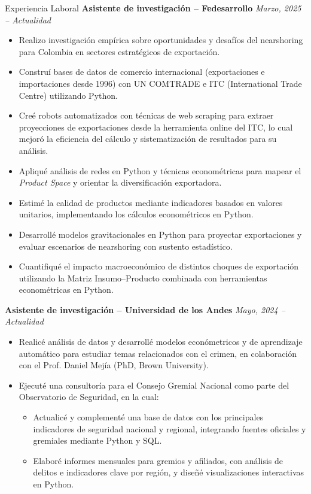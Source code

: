 \documentclass{resume}
\begin{document}
\begin{rSection}{Experiencia Laboral}
{\bf Asistente de investigación – Fedesarrollo} \hfill {\em Marzo, 2025 – Actualidad}
\begin{itemize}
    \item Realizo investigación empírica sobre oportunidades y desafíos del nearshoring para Colombia en sectores estratégicos de exportación.
    \item Construí bases de datos de comercio internacional (exportaciones e importaciones desde 1996) con UN COMTRADE e ITC (International Trade Centre) utilizando Python.
    \item Creé robots automatizados con técnicas de web scraping para extraer proyecciones de exportaciones desde la herramienta online del ITC, lo cual mejoró la eficiencia del cálculo y sistematización de resultados para su análisis.
    \item Apliqué análisis de redes en Python y técnicas econométricas para mapear el \textit{Product Space} y orientar la diversificación exportadora.
    \item Estimé la calidad  de productos mediante indicadores basados en valores unitarios, implementando los cálculos econométricos en Python.
    \item Desarrollé modelos gravitacionales en Python para proyectar exportaciones y evaluar escenarios de nearshoring con sustento estadístico.
    \item Cuantifiqué el impacto macroeconómico de distintos choques de exportación utilizando la Matriz Insumo--Producto combinada con herramientas econométricas en Python.
\end{itemize}
{\bf Asistente de investigación – Universidad de los Andes} \hfill {\em Mayo, 2024 – Actualidad}
\begin{itemize}
    \item Realicé análisis de datos y desarrollé modelos económetricos y de aprendizaje automático para estudiar temas relacionados con el crimen, en colaboración con el Prof. Daniel Mejía (PhD, Brown University).
    \item Ejecuté una consultoría para el Consejo Gremial Nacional como parte del Observatorio de Seguridad, en la cual:
    \begin{itemize}
        \item Actualicé y complementé una base de datos con los principales indicadores de seguridad nacional y regional, integrando fuentes oficiales y gremiales mediante Python y SQL.
        \item Elaboré informes mensuales para gremios y afiliados, con análisis de delitos e indicadores clave por región, y diseñé visualizaciones interactivas en Python.

\end{itemize}
\end{itemize}
\end{rSection}
\end{document}
